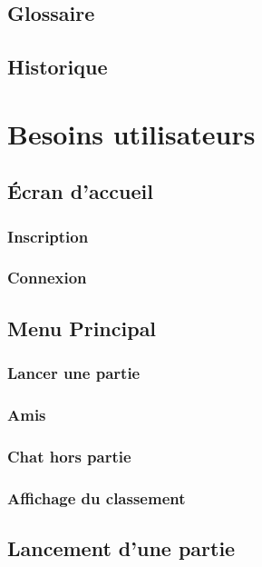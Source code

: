 \documentclass{article}
\begin{document}
\subsection{Glossaire}

\subsection{Historique}

\section{Besoins utilisateurs}

\subsection{Écran d'accueil}

\subsubsection{Inscription}

\subsubsection{Connexion}

\subsection{Menu Principal}

\subsubsection{Lancer une partie}

\subsubsection{Amis}

\subsubsection{Chat hors partie}

\subsubsection{Affichage du classement}

\subsection{Lancement d'une partie}
\end{document}
